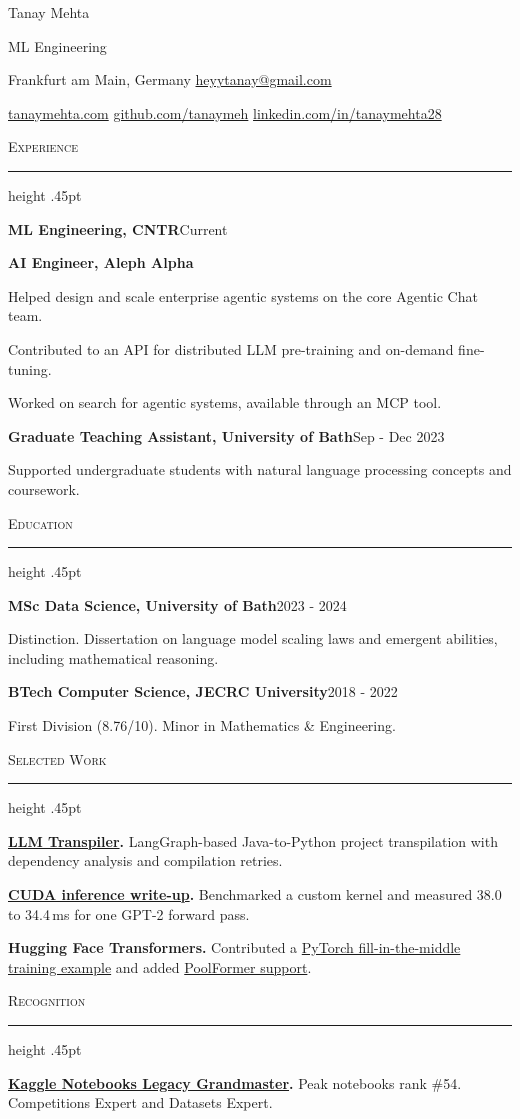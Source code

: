 \documentclass[12pt,a4paper]{article}
\newcommand{\cvsection}[1]{%
  \par\addvspace{1.55em}%
  {\large\scshape #1}\par\nopagebreak[4]%
  \vspace{.25em}\hrule height .45pt\nopagebreak[4]\vspace{.65em}%
}
\newcommand{\cvrole}[2]{%
  \textbf{#1}\hfill{\small #2}\par\nopagebreak[4]%
}
\newcommand{\workitem}[2]{\textbf{#1} #2\par\vspace{.45em}}
\begin{document}
{\fontsize{34}{37}\selectfont Tanay Mehta}\par
\vspace{.3em}
{\large ML Engineering}\par
\vspace{.75em}
{\small Frankfurt am Main, Germany
  \quad\textbar\quad \href{mailto:heyytanay@gmail.com}{heyytanay@gmail.com}\par
  \href{https://www.tanaymehta.com/}{tanaymehta.com}
  \quad\textbar\quad \href{https://github.com/tanaymeh}{github.com/tanaymeh}
  \quad\textbar\quad \href{https://www.linkedin.com/in/tanaymehta28/}{linkedin.com/in/tanaymehta28}\par}

\cvsection{Experience}
\cvrole{ML Engineering, CNTR}{Current}
\vspace{.65em}
\cvrole{AI Engineer, Aleph Alpha}{}
\begin{list}{\textbullet}{%
    \setlength{\leftmargin}{1em}%
    \setlength{\labelwidth}{.45em}%
    \setlength{\labelsep}{.55em}%
    \setlength{\topsep}{.18em}%
    \setlength{\itemsep}{.12em}%
    \setlength{\parsep}{0pt}}
  \item Helped design and scale enterprise agentic systems on the core Agentic Chat team.
  \item Contributed to an API for distributed LLM pre-training and on-demand fine-tuning.
  \item Worked on search for agentic systems, available through an MCP tool.
\end{list}
\vspace{.65em}
\cvrole{Graduate Teaching Assistant, University of Bath}{Sep - Dec 2023}
Supported undergraduate students with natural language processing concepts and coursework.\par

\cvsection{Education}
\cvrole{MSc Data Science, University of Bath}{2023 - 2024}
Distinction. Dissertation on language model scaling laws and emergent abilities, including mathematical reasoning.\par
\vspace{.65em}
\cvrole{BTech Computer Science, JECRC University}{2018 - 2022}
First Division (8.76/10). Minor in Mathematics \& Engineering.\par

\cvsection{Selected Work}
\workitem{\href{https://github.com/tanaymeh/llm-transpiler\#project-level-transpile}{LLM Transpiler}.}{LangGraph-based Java-to-Python project transpilation with dependency analysis and compilation retries.}
\workitem{\href{https://www.tanaymehta.com/blog/2025/08/02/p9.html}{CUDA inference write-up}.}{Benchmarked a custom kernel and measured 38.0 to 34.4\,ms for one GPT-2 forward pass.}
\workitem{Hugging Face Transformers.}{Contributed a \href{https://github.com/huggingface/transformers/pull/27464}{PyTorch fill-in-the-middle training example} and added \href{https://github.com/huggingface/transformers/pull/15531}{PoolFormer support}.}

\cvsection{Recognition}
\textbf{\href{https://kaggle.com/heyytanay}{Kaggle Notebooks Legacy Grandmaster}.} Peak notebooks rank \#54. Competitions Expert and Datasets Expert.\par
\end{document}
